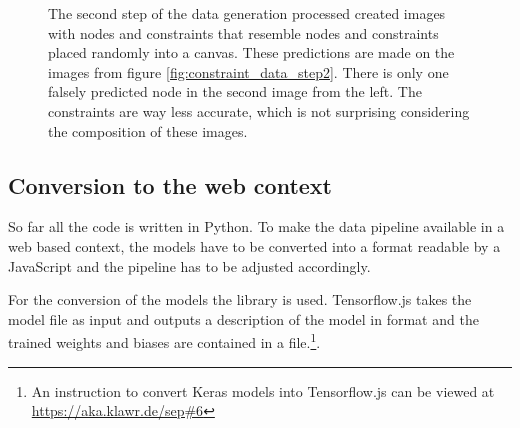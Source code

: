 \begin{figure}
\begin{subfigure}[b]{0.19\textwidth}
    \end{subfigure}
    \begin{subfigure}[b]{0.19\textwidth}
    \end{subfigure}
    \caption{The second step of the data generation processed created images with nodes and constraints that resemble nodes and constraints placed randomly into a canvas. These predictions are made on the images from figure \ref{fig:constraint_data_step2}. There is only one falsely predicted node in the second image from the left. The constraints are way less accurate, which is not surprising considering the composition of these images.}
\end{figure}

\subsection{Conversion to the web context}

So far all the code is written in Python.
To make the data pipeline available in a web based context, the models have to be converted into a format readable by a JavaScript and the pipeline has to be adjusted accordingly.

For the conversion of the models the library  %
is used.
Tensorflow.js takes the model file as input and outputs a description of the model in  format and the trained weights and biases are contained in a  file.\footnote{An instruction to convert Keras models into Tensorflow.js can be viewed at \url{https://aka.klawr.de/sep\#6}}. %

